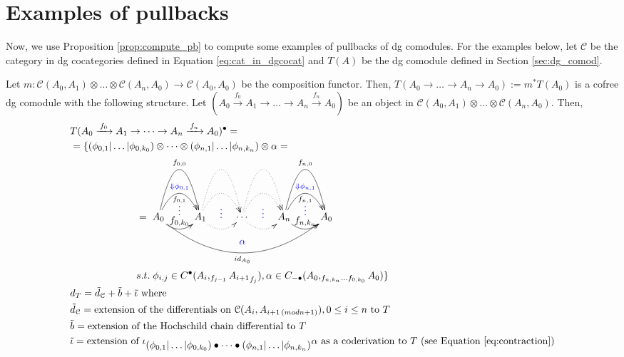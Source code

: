 \section{Examples of pullbacks}\label{sec:pb_example}
%
Now, we use Proposition \ref{prop:compute_pb} 
to compute some examples of pullbacks of 
dg comodules. For the examples below, 
let $\mathcal{C}$ 
be the category in dg cocategories defined in 
Equation \ref{eq:cat_in_dgcocat} and $T(A)$ be the 
dg comodule defined in Section \ref{sec:dg_comod}.

\begin{eg} Let $m:\mathcal{C}(A_0,A_1) \otimes 
\dots \otimes \mathcal{C}(A_n, A_0) \to 
\mathcal{C}(A_0,A_0)$ be the composition 
functor. Then, $T(A_0 \to \dots \to A_n \to A_0) 
:= m^*T(A_0)$ is a cofree dg comodule with 
the following structure. Let 
$(A_0 \xrightarrow{f_0} A_1 \to \dots \to 
A_n \xrightarrow{f_n} A_0)$ be an object 
in $\mathcal{C}(A_0,A_1) \otimes \dots \otimes 
\mathcal{C}(A_n, A_0)$. Then,
\begin{align*}
&T(A_0 \xrightarrow{f_0} A_1 \to \dots \to 
A_n \xrightarrow{f_n} A_0)^\bullet = \\
&= \{
  (\phi_{0,1}|\dots|\phi_{0,k_0}) \otimes \dots \otimes
  (\phi_{n,1}|\dots|\phi_{n,k_n}) \otimes \alpha = \\
&\phantom{moveovermove} =
  \xymatrix{
  A_0 \ar@/^4pc/[r]^{f_{0,0}} 
  \ar@/^2pc/[r]^{\textcolor{blue}{\Downarrow \phi_{0,1}}}_{f_{0,1}} 
  \ar@/_1pc/[r]^{\substack{\textcolor{blue}{\vdots}\\ f_{0,k_0}}}
  \ar@/_3pc/[rrrr]^{\substack{\textcolor{blue}{\alpha} \\\\}}_{ id_{A_0}}
  & A_1 \ar@{.>}@/^4pc/[r] 
  \ar@{.>}@/^2pc/[r]_{\substack{\\ \\ \textcolor{blue}{\vdots}}} 
  \ar@{.>}@/_1pc/[r]
  & \cdots \ar@{.>}@/^4pc/[r] 
  \ar@{.>}@/^2pc/[r]_{\substack{\\ \\ \textcolor{blue}{\vdots}}} 
  \ar@{.>}@/_1pc/[r]
  & A_n \ar@/^4pc/[r]^{f_{n,0}} 
  \ar@/^2pc/[r]^{\textcolor{blue}{\Downarrow \phi_{n,1}}}_{f_{n,1}} 
  \ar@/_1pc/[r]^{\substack{\textcolor{blue}{\vdots}\\ f_{n,k_n}}}
  & A_0 
  }\\
&\phantom{moveovermove}
   s.t.\; \phi_{i,j} \in C^\bullet(A_i, _{f_{j-1}} {A_{i+1}}_{f_j}),
    \alpha \in C_{-\bullet}(A_0, _{f_{n,k_n}\dots f_{0,k_0}} A_0)\}\\
&d_{T} = 
  \tilde{d}_{\mathcal{C}} + \tilde{b} + \tilde{\iota} 
  \textrm{ where}\\
&\tilde{d}_{\mathcal{C}} = 
  \textrm{extension of the differentials on 
  $\mathcal{C}(A_i,A_{i+1 \, (mod n+1)}), 0 \leq i \leq n$ to $T$}\\
&\tilde{b} =
  \textrm{extension of the Hochschild chain differential to $T$}\\
&\tilde{\iota} = 
  \textrm{extension of $\iota_{\scriptstyle (\phi_{0,1}|\dots|\phi_{0,k_0}) 
    \bullet \dots \bullet (\phi_{n,1}|\dots|\phi_{n,k_n})} \alpha$ as a coderivation to $T$ (see Equation \ref{eq:contraction})}
\end{align*}
\end{eg}
